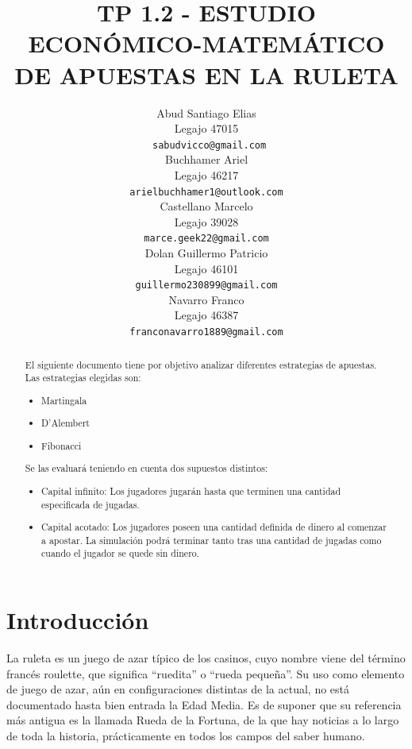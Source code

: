 \documentclass{article}
\title{TP 1.2 - ESTUDIO ECONÓMICO-MATEMÁTICO DE APUESTAS EN LA RULETA}
\author{
    Abud Santiago Elias \\
    Legajo 47015 \\
    \texttt{ sabudvicco@gmail.com} \\
    \And
    Buchhamer Ariel \\
    Legajo 46217\\
    \texttt{arielbuchhamer1@outlook.com} \\
    \And
    Castellano Marcelo \\
    Legajo 39028 \\
    \texttt{marce.geek22@gmail.com} \\
    \And
    Dolan Guillermo Patricio \\
    Legajo 46101\\
    \texttt{guillermo230899@gmail.com} \\
    \And
    Navarro Franco \\
    Legajo 46387 \\
    \texttt{franconavarro1889@gmail.com} \\
}
\begin{document}
    \maketitle
    \begin{abstract}
        El siguiente documento tiene por objetivo analizar diferentes estrategias de apuestas.
        Las estrategias elegidas son:
        \begin{itemize}
          \item Martingala %
          \item D'Alembert %
          \item Fibonacci
        \end{itemize}
        Se las evaluará teniendo en cuenta dos supuestos distintos:
        \begin{itemize}
          \item Capital infinito: Los jugadores jugarán hasta que terminen una cantidad especificada de jugadas.
          \item Capital acotado: Los jugadores poseen una cantidad definida de dinero al comenzar a apostar.
          La simulación podrá terminar tanto tras una cantidad de jugadas como cuando el jugador se quede sin dinero.
        \end{itemize}
    \end{abstract}






    \section{Introducción}
    La ruleta es un juego de azar típico de los casinos, cuyo nombre viene del término francés roulette,
    que significa ``ruedita'' o ``rueda pequeña''. Su uso como elemento de juego de azar, aún
    en configuraciones distintas de la actual, no está documentado hasta bien entrada la Edad Media.
    Es de suponer que su referencia más antigua es la llamada Rueda de la Fortuna, de la que hay
    noticias a lo largo de toda la historia, prácticamente en todos los campos del saber humano.
\end{document}
